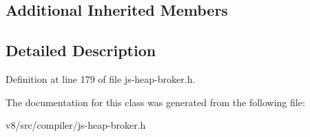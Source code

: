 \subsection*{Additional Inherited Members}


\subsection{Detailed Description}


Definition at line 179 of file js-\/heap-\/broker.\+h.



The documentation for this class was generated from the following file\+:\begin{DoxyCompactItemize}
\item 
v8/src/compiler/js-\/heap-\/broker.\+h\end{DoxyCompactItemize}
